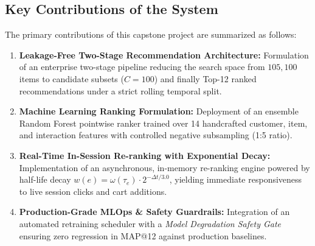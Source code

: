 \subsection{Key Contributions of the System}
The primary contributions of this capstone project are summarized as follows:
\begin{enumerate}
    \item \textbf{Leakage-Free Two-Stage Recommendation Architecture:} Formulation of an enterprise two-stage pipeline reducing the search space from $105,100$ items to candidate subsets ($C=100$) and finally Top-12 ranked recommendations under a strict rolling temporal split.
    \item \textbf{Machine Learning Ranking Formulation:} Deployment of an ensemble Random Forest pointwise ranker trained over 14 handcrafted customer, item, and interaction features with controlled negative subsampling (1:5 ratio).
    \item \textbf{Real-Time In-Session Re-ranking with Exponential Decay:} Implementation of an asynchronous, in-memory re-ranking engine powered by half-life decay $w(e) = \omega(\tau_e) \cdot 2^{-\Delta t / 3.0}$, yielding immediate responsiveness to live session clicks and cart additions.
    \item \textbf{Production-Grade MLOps \& Safety Guardrails:} Integration of an automated retraining scheduler with a \textit{Model Degradation Safety Gate} ensuring zero regression in MAP@12 against production baselines.
\end{enumerate}

